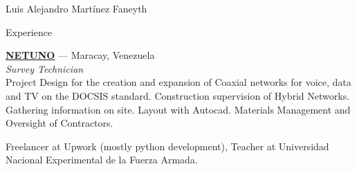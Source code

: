 \documentclass[10pt,letterpaper]{article}
\begin{document}
\begin{cv}{Luis Alejandro Mart\'inez Faneyth}
\begin{cvlist}{Experience}
{	\parbox[t]{\linewidth}{
		\textbf{\href{https://www.netuno.net}{NETUNO}} --- Maracay, Venezuela\\
		\textit{Survey Technician}\\
		\footnotesize{Project Design for the creation and expansion of Coaxial networks for voice, data and TV on the DOCSIS standard. Construction supervision of Hybrid Networks. Gathering information on site. Layout with Autocad. Materials Management and Oversight of Contractors.}
	}
}
\item[{\parbox[t]{6em}{\textit{\large{Other\\experience}}}}]{
	\parbox[t]{\linewidth}{
		\footnotesize{Freelancer at Upwork (mostly python development), Teacher at Universidad Nacional Experimental de la Fuerza Armada.}
	}
}
\end{cvlist}


\end{cv}
\end{document}
